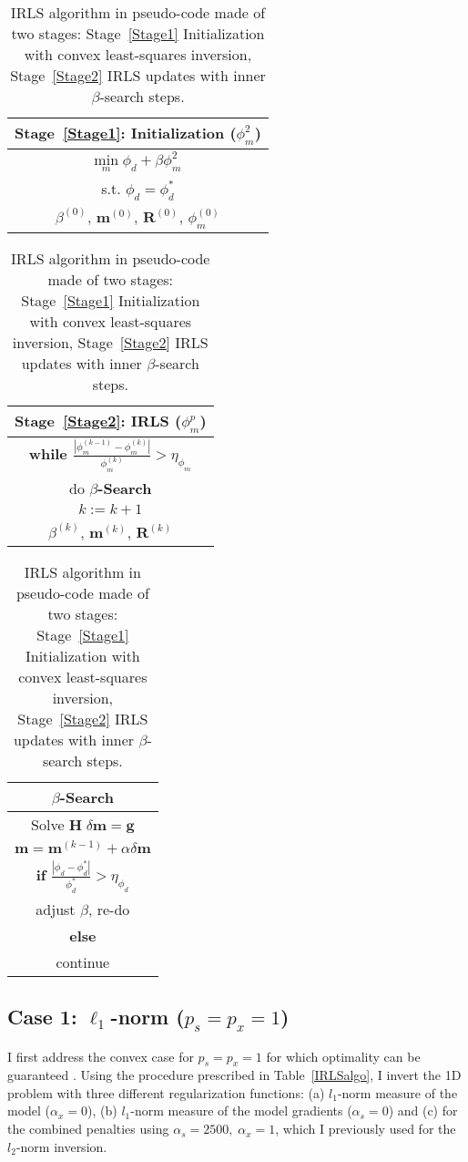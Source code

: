 \begin{table}\centering
\def\arraystretch{1.25}
\begin{tabular}{|c|}\hline
\bf{Stage~\ref{Stage1}}: Initialization ($\phi_m^2$)	\\ \hline
$\underset{m}{\text{min}}\; \phi_d + \beta \phi_m^2$\\
s.t. $\phi_d = \phi_d^*$ \\
$\beta^{(0)}$, $\mathbf{m}^{(0)}$, $\mathbf{R}^{(0)}$, $\phi_m^{(0)}$\\\hline
\end{tabular}
\begin{tabular}{|c|}\hline
\bf{Stage~\ref{Stage2}}: IRLS ($\phi_m^p$)	\\ \hline
\bf{while} \; $\frac{|\phi_m^{(k-1)}-\phi_m^{(k)}|}{\phi_m^{(k)}} > \eta_{\phi_m}$ \\
do \textbf{$\beta$-Search} \\
$k := k+1$\\
$\beta^{(k)}$, $\mathbf{m}^{(k)}$, $\mathbf{R}^{(k)}$\\\hline
\end{tabular}
\begin{tabular}{|c|}\hline
\textbf{$\beta$-Search} \\ \hline
Solve $\mathbf{H}\; \delta \mathbf{m} = \mathbf{g}$ \\
$\mathbf{m} = \mathbf{m}^{(k-1)} + \alpha \delta \mathbf{m}$ \\
\textbf{if} $\frac{|\phi_d - \phi_d^*|}{\phi_d^*} > \eta_{\phi_d} $ \\
adjust $\beta$, re-do\\
\textbf{else} \\
continue \\ \hline
\end{tabular}
\caption{IRLS algorithm in pseudo-code made of two stages: Stage~\ref{Stage1} Initialization with convex least-squares inversion, Stage~\ref{Stage2} IRLS updates with inner $\beta$-search steps.}
\label{IRLSalgo}
\end{table}

\subsection{Case 1: $\ell_1$-norm ($p_s=p_x=1$)}\label{l1norm}
I first address the convex case for $p_s = p_x = 1$ for which optimality can be guaranteed \cite[]{Osborne1985, Daubechies10}.
Using the procedure prescribed in Table~\eqref{IRLSalgo}, I invert the 1D problem with three different regularization functions: (a) $l_1$-norm measure of the model ($\alpha_x = 0$), (b) $l_1$-norm measure of the model gradients ($\alpha_s = 0$) and (c) for the combined penalties using $\alpha_s=2500,\;\alpha_x = 1$, which I previously used for the $l_2$-norm inversion.

